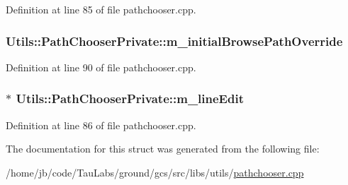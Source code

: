 \-Definition at line 85 of file pathchooser.\-cpp.

\hypertarget{struct_utils_1_1_path_chooser_private_a4f55a8d0bc8cc0199a158f632e6f053a}{
\subsubsection[{m\-\_\-initial\-Browse\-Path\-Override}]{ {\bf \-Utils\-::\-Path\-Chooser\-Private\-::m\-\_\-initial\-Browse\-Path\-Override}}}\label{struct_utils_1_1_path_chooser_private_a4f55a8d0bc8cc0199a158f632e6f053a}


\-Definition at line 90 of file pathchooser.\-cpp.

\hypertarget{struct_utils_1_1_path_chooser_private_ae5140b32894490e7013b4f9f8ee18afc}{
\subsubsection[{m\-\_\-line\-Edit}]{$\ast$ {\bf \-Utils\-::\-Path\-Chooser\-Private\-::m\-\_\-line\-Edit}}}\label{struct_utils_1_1_path_chooser_private_ae5140b32894490e7013b4f9f8ee18afc}


\-Definition at line 86 of file pathchooser.\-cpp.



\-The documentation for this struct was generated from the following file\-:\begin{DoxyCompactItemize}
\item 
/home/jb/code/\-Tau\-Labs/ground/gcs/src/libs/utils/\hyperlink{pathchooser_8cpp}{pathchooser.\-cpp}\end{DoxyCompactItemize}
